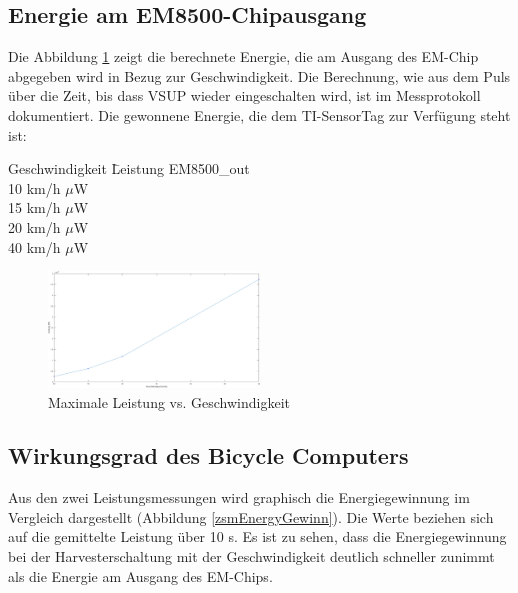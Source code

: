 \subsection{Energie am EM8500-Chipausgang}

Die Abbildung \ref{energie_resultat_harvester} zeigt die berechnete Energie, die am Ausgang des EM-Chip abgegeben wird in Bezug zur Geschwindigkeit. Die Berechnung, wie aus dem Puls über die Zeit, bis dass VSUP wieder eingeschalten wird, ist im  Messprotokoll \cite{messung_emausgang_finish} dokumentiert. Die gewonnene Energie, die dem TI-SensorTag zur Verfügung steht ist:


\begin{minipage}{\textwidth}
    \label{res_em_aus}
    \begin{tabbing}
        Geschwindigkeit \quad\= Leistung EM8500\_out \\[0.8ex]
        10 km/h     $\mu$W\\
        15 km/h    $\mu$W\\
        20 km/h    $\mu$W\\
        40 km/h   $\mu$W\\
    \end{tabbing}
\end{minipage}


\begin{figure}[ht]
    \includegraphics[width=0.5\textwidth]{4Resultate/imag/ResultatLeistungGeschwindigkeit.png} 
    \caption{Maximale Leistung vs. Geschwindigkeit}
    \label{energie_resultat_harvester}
\end{figure}

\subsection{Wirkungsgrad des Bicycle Computers}

Aus den zwei Leistungsmessungen wird graphisch die Energiegewinnung im Vergleich dargestellt (Abbildung \ref{zsmEnergyGewinn}). Die Werte beziehen sich auf die gemittelte Leistung über 10 s. Es ist zu sehen, dass die Energiegewinnung bei der Harvesterschaltung mit der Geschwindigkeit deutlich schneller zunimmt als die Energie am Ausgang des EM-Chips. 

